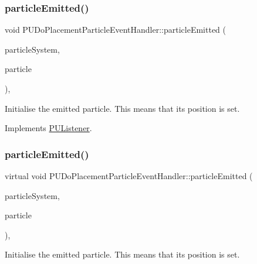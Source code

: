 \subsubsection{\texorpdfstring{particle\+Emitted()}{particleEmitted()}\hspace{0.1cm}{\footnotesize\ttfamily [1/2]}}
{\footnotesize\ttfamily void P\+U\+Do\+Placement\+Particle\+Event\+Handler\+::particle\+Emitted (\begin{DoxyParamCaption}\item[{\hyperlink{classPUParticleSystem3D}{P\+U\+Particle\+System3D} $\ast$}]{particle\+System,  }\item[{\hyperlink{structPUParticle3D}{P\+U\+Particle3D} $\ast$}]{particle }\end{DoxyParamCaption})\hspace{0.3cm}{\ttfamily [override]}, {\ttfamily [virtual]}}

Initialise the emitted particle. This means that its position is set. 

Implements \hyperlink{classPUListener}{P\+U\+Listener}.

\mbox{\label{classPUDoPlacementParticleEventHandler_a7a287666100cc49f771f77bdde488292}} 
\subsubsection{\texorpdfstring{particle\+Emitted()}{particleEmitted()}\hspace{0.1cm}{\footnotesize\ttfamily [2/2]}}
{\footnotesize\ttfamily virtual void P\+U\+Do\+Placement\+Particle\+Event\+Handler\+::particle\+Emitted (\begin{DoxyParamCaption}\item[{\hyperlink{classPUParticleSystem3D}{P\+U\+Particle\+System3D} $\ast$}]{particle\+System,  }\item[{\hyperlink{structPUParticle3D}{P\+U\+Particle3D} $\ast$}]{particle }\end{DoxyParamCaption})\hspace{0.3cm}{\ttfamily [override]}, {\ttfamily [virtual]}}

Initialise the emitted particle. This means that its position is set. 


